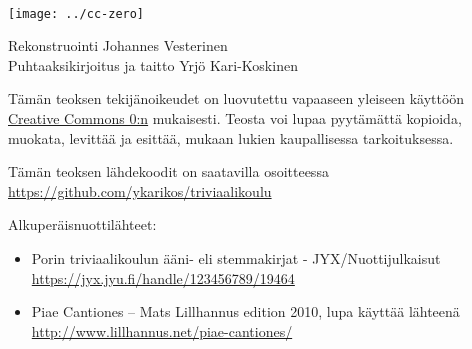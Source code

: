 \newpage
~\vfill
\thispagestyle{empty}
\setlength{\parindent}{0pt}
\setlength{\parskip}{\baselineskip}

\the\year

\texttt{[image: ../cc-zero]}

Rekonstruointi Johannes Vesterinen \\
Puhtaaksikirjoitus ja taitto Yrjö Kari-Koskinen

Tämän teoksen tekijänoikeudet on luovutettu vapaaseen yleiseen käyttöön  \href{https://creativecommons.org/publicdomain/zero/1.0/deed.fi}{Creative Commons 0:n} mukaisesti. Teosta voi lupaa pyytämättä kopioida, muokata, levittää ja esittää, mukaan lukien kaupallisessa tarkoituksessa.

Tämän teoksen lähdekoodit on saatavilla osoitteessa \url{https://github.com/ykarikos/triviaalikoulu}

Alkuperäisnuottilähteet:
\begin{itemize}
\item Porin triviaalikoulun ääni- eli stemmakirjat - JYX/Nuottijulkaisut \\ \url{https://jyx.jyu.fi/handle/123456789/19464}
\item Piae Cantiones – Mats Lillhannus edition 2010, lupa käyttää lähteenä \\ \url{http://www.lillhannus.net/piae-cantiones/}
\end{itemize}


